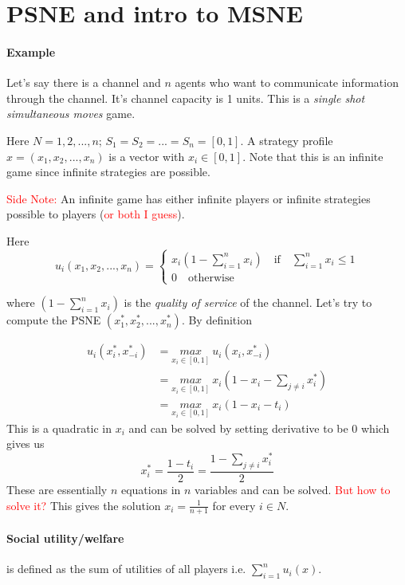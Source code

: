 \section{PSNE and intro to MSNE}
\paragraph{Example} Let's say there is a channel and $n$ agents who want to communicate information through the channel. It's channel capacity is 1 units. This is a \textit{single shot simultaneous moves} game.

Here $N = {1,2, ..., n}$; $S_1 = S_2 = ... = S_n = [0,1]$. A strategy profile $x = (x_1, x_2, ..., x_n)$ is a vector with $x_i \in [0, 1]$. Note that this is an infinite game since infinite strategies are possible.

\textcolor{red}{Side Note:} An infinite game has either infinite players or infinite strategies possible to players (\textcolor{red}{or both I guess}).

Here 
\[
u_i(x_1, x_2, ..., x_n) = 
\begin{cases}
x_i(1 - \sum_{i=1}^{n}x_i) \quad \text{if} \quad \sum_{i=1}^{n}x_i \leq 1\\
0 \quad \text{otherwise}
\end{cases}
\]

where $(1 - \sum_{i=1}^{n}x_i)$ is the \textit{quality of service} of the channel. Let's try to compute the PSNE $(x_1^*, x_2^*, ..., x_n^*)$. By definition


\begin{align*}
u_i(x_i^*, x_{-i}^*)
& = \underset{x_i \in [0,1]}{max}~u_i(x_i, x_{-i}^*)\\
& = \underset{x_i \in [0,1]}{max}~x_i(1 - x_i - \sum_{j \neq i}x_i^*)\\
& = \underset{x_i \in [0,1]}{max}~x_i(1 - x_i - t_i)
\end{align*}
This is a quadratic in $x_i$ and can be solved by setting derivative to be 0 which gives us 
\[
x_i^* = \frac{1 - t_i}{2} = \frac{1 - \sum_{j \neq i}x_i^*}{2}
\]
These are essentially $n$ equations in $n$ variables and can be solved. \textcolor{red}{But how to solve it?} This gives the solution $x_i = \frac{1}{n+1}$ for every $i \in N$.

\paragraph{Social utility/welfare} is defined as the sum of utilities of all players i.e. $\sum_{i=1}^{n}u_i(x)$. 

